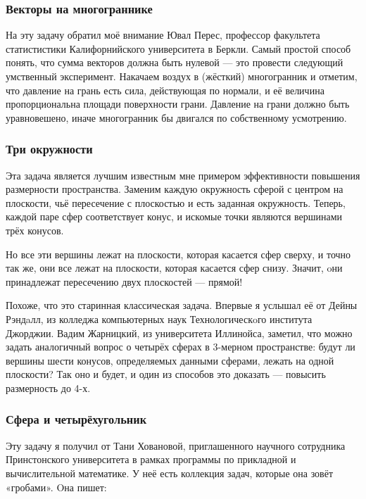 \subsubsection*{Векторы на многограннике}%

На эту задачу обратил моё внимание Ювал Перес, профессор факультета статистистики Калифорнийского университета в Беркли. %
Самый простой способ понять, что сумма векторов должна быть нулевой --- это провести следующий умственный эксперимент.
Накачаем воздух в (жёсткий) многогранник и отметим, что давление на грань есть сила, действующая по нормали, и её величина пропорциональна площади поверхности грани.
Давление на грани должно быть уравновешено, иначе многогранник бы двигался по собственному усмотрению.
\heart

\subsubsection*{Три окружности}%

Эта задача является лучшим известным мне примером эффективности повышения размерности пространства.
Заменим каждую окружность сферой с центром на плоскости, чьё пересечение с плоскостью и есть заданная окружность.
Теперь, каждой паре сфер соответствует конус, и искомые точки являются вершинами трёх конусов. %

Но все эти вершины лежат на плоскости, которая касается сфер сверху, и точно так
же, они все лежат на плоскости, которая касается сфер снизу.
Значит, oни принадлежат пересечению двух плоскостей --- прямой! \heart

Похоже, что это старинная классическая задача.
Впервые я услышал её от Дейны Рэндaлл, %
из колледжа компьютерных наук Технологическoго института Джорджии.
Вадим Жарницкий, из университета Иллинойса, заметил, что можно задать аналогичный вопрос о четырёх сферах в 3-мерном пространстве: будут ли вершины шести конусов, определяемых данными сферами, лежать на одной плоскости?
Так оно и будет, и один из способов это доказать --- повысить размерность до 4-х.

\subsubsection*{Сфера и четырёхугольник}%

Эту задачу я получил от Тани Ховановой, приглашенного научного сотрудника Принстонского университета в рамках программы по прикладной и вычислительной математике.
У неё есть коллекция задач, которые она зовёт «гробами».
Oна пишет:

